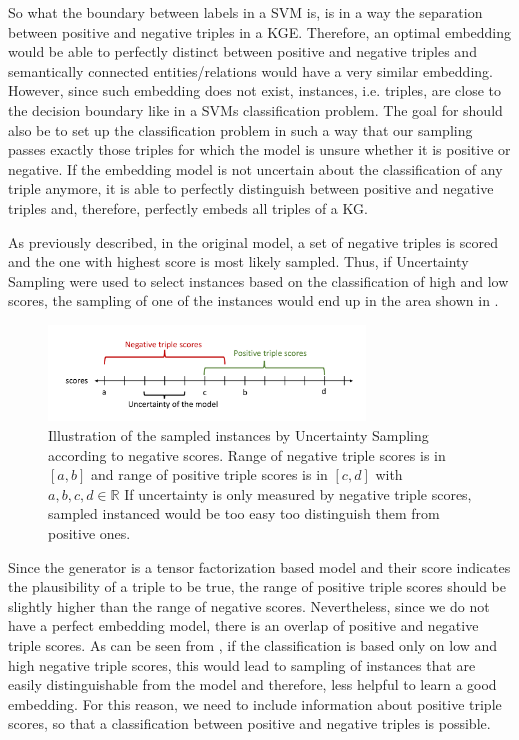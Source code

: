 So what the boundary between labels in a \ac{SVM} is, is in a way the separation between positive and negative triples in a \ac{KGE}.
Therefore, an optimal embedding would be able to perfectly distinct between positive and negative triples and semantically connected entities/relations would have a very similar embedding.
However, since such embedding does not exist, instances, i.e. triples, are close to the decision boundary like in a \acp{SVM} classification problem.
The goal for \ucgan should also be to set up the classification problem in such a way that our sampling passes  exactly those triples for which the model is unsure whether it is positive or negative.
If the embedding model is not uncertain about the classification of any triple anymore, it is able to perfectly distinguish between positive and negative triples and, therefore, perfectly embeds all triples of a \ac{KG}.

As previously described, in the original \kbgan model, a set of negative triples is scored and the one with highest score is most likely sampled.
Thus, if Uncertainty Sampling were used to select instances based on the classification of high and low scores, the sampling of one of the instances would end up in the area shown in .
\begin{figure}[t]
  \centering
    \includegraphics[width=0.75\textwidth]{figures/badVsGoodApproach.pdf}
  \caption{Illustration of the sampled instances by Uncertainty Sampling according to negative scores.
  Range of negative triple scores is in $[a, b]$ and range of positive triple scores is in  $[c, d]$ with $a,b,c,d \in \mathbb{R}$
  If uncertainty is only measured by negative triple scores, sampled instanced would be too easy too distinguish them from positive ones.}
  \label{fig:badVsGoodApproach}
\end{figure}
Since the generator is a tensor factorization based model and their score indicates the plausibility of a triple to be true, the range of positive triple scores should be slightly higher than the range of negative scores.
Nevertheless, since we do not have a perfect embedding model, there is an overlap of positive and negative triple scores.
As can be seen from , if the classification is based only on low and high negative triple scores, this would lead to sampling of instances that are easily distinguishable from the model and therefore, less helpful to learn a good embedding.
For this reason, we need to include information about positive triple scores, so that a classification between positive and negative triples is possible.


